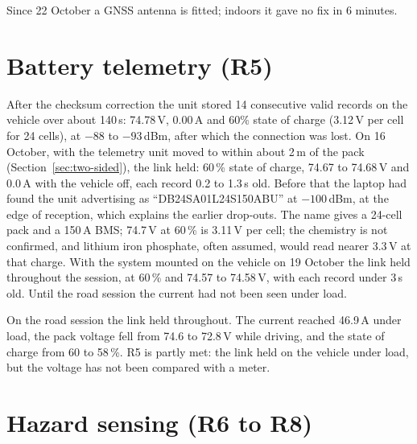 Since 22 October a GNSS antenna is fitted; indoors it gave no fix in 6 minutes.

\section{Battery telemetry (R5)}
\label{sec:resx-bms}

After the checksum correction the unit stored 14 consecutive valid records on the vehicle over about 140\,s: 74.78\,V, 0.00\,A and 60\% state of charge (3.12\,V per cell for 24 cells), at $-88$ to $-93$\,dBm, after which the connection was lost. On 16 October, with the telemetry unit moved to within about 2\,m of the pack (Section~\ref{sec:two-sided}), the link held: 60\,\% state of charge, 74.67 to 74.68\,V and 0.0\,A with the vehicle off, each record 0.2 to 1.3\,s old. Before that the laptop had found the unit advertising as ``DB24SA01L24S150ABU'' at $-100$\,dBm, at the edge of reception, which explains the earlier drop-outs. The name gives a 24-cell pack and a 150\,A BMS; 74.7\,V at 60\,\% is 3.11\,V per cell; the chemistry is not confirmed, and lithium iron phosphate, often assumed, would read nearer 3.3\,V at that charge. With the system mounted on the vehicle on 19 October the link held throughout the session, at 60\,\% and 74.57 to 74.58\,V, with each record under 3\,s old. Until the road session the current had not been seen under load.

On the road session the link held throughout. The current reached 46.9\,A under load, the pack voltage fell from 74.6 to 72.8\,V while driving, and the state of charge from 60 to 58\,\%. R5 is partly met: the link held on the vehicle under load, but the voltage has not been compared with a meter.

\section{Hazard sensing (R6 to R8)}
\label{sec:resx-hazard}

